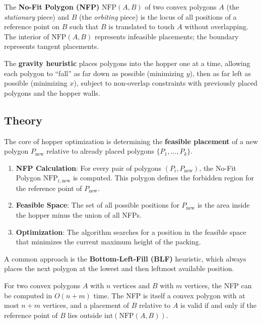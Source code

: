 \begin{definition}\label{def:nfp}
The \textbf{No-Fit Polygon (NFP)} $\text{NFP}(A, B)$ of two convex polygons $A$ (the \emph{stationary} piece) and $B$ (the \emph{orbiting} piece) is the locus of all positions of a reference point on $B$ such that $B$ is translated to touch $A$ without overlapping. The interior of $\text{NFP}(A,B)$ represents infeasible placements; the boundary represents tangent placements.
\end{definition}

\begin{definition}\label{def:gravity_heuristic}
The \textbf{gravity heuristic} places polygons into the hopper one at a time, allowing each polygon to ``fall'' as far down as possible (minimizing $y$), then as far left as possible (minimizing $x$), subject to non-overlap constraints with previously placed polygons and the hopper walls.
\end{definition}

\subsection{Theory}
The core of hopper optimization is determining the \textbf{feasible placement} of a new polygon $P_{\text{new}}$ relative to already placed polygons $\{P_1, \dots, P_k\}$.
\begin{enumerate}
    \item \textbf{NFP Calculation}: For every pair of polygons $(P_i, P_{\text{new}})$, the No-Fit Polygon $\text{NFP}_{i,\text{new}}$ is computed. This polygon defines the forbidden region for the reference point of $P_{\text{new}}$.
    \item \textbf{Feasible Space}: The set of all possible positions for $P_{\text{new}}$ is the area inside the hopper minus the union of all NFPs.
    \item \textbf{Optimization}: The algorithm searches for a position in the feasible space that minimizes the current maximum height of the packing.
\end{enumerate}

A common approach is the \textbf{Bottom-Left-Fill (BLF)} heuristic, which always places the next polygon at the lowest and then leftmost available position.

\begin{theorem}\label{thm:nfp_correctness}
For two convex polygons $A$ with $n$ vertices and $B$ with $m$ vertices, the NFP can be computed in $O(n + m)$ time. The NFP is itself a convex polygon with at most $n + m$ vertices, and a placement of $B$ relative to $A$ is valid if and only if the reference point of $B$ lies outside $\text{int}(\text{NFP}(A,B))$.
\end{theorem}

